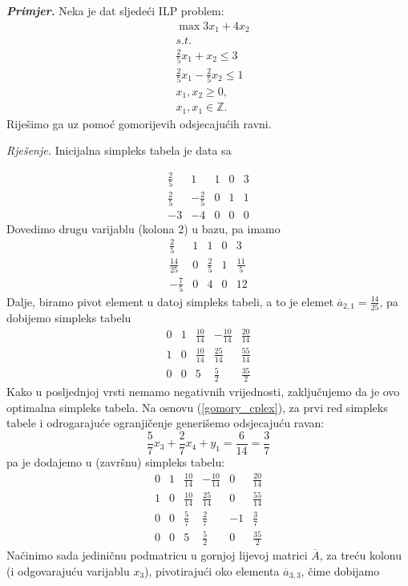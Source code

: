 \documentclass[a4paper, utf8, 11pt, colorlinks]{book}
\begin{document}
\emph{\textbf{Primjer.}} Neka je dat sljedeći ILP problem:\\
$$\begin{array}{ll}
    &\max 3 x_1 + 4 x_2 \\
    & {s.t. }  \\
    & \frac{2}{5}x_1 + x_2 \leq 3 \\
    &\frac{2}{5}x_1 - \frac{2}{5}x_2 \leq 1 \\
    &x_1, x_2 \geq 0, \\
    &  x_1, x_1 \in \mathbb{Z}.
\end{array}$$
Riješimo ga uz pomoć gomorijevih odsjecajućih ravni. 

\emph{Rješenje.}
Inicijalna simpleks tabela je data sa 

$$\begin{array}{cccc|c}
   \frac{2}{5}           & 1               & 1 & 0 & 3 \\
   \frac{2}{5}           & -\frac{2}{5}    & 0 & 1 & 1 \\ \hline
   -3                    &  -4             & 0 & 0 & 0
\end{array}$$
Dovedimo drugu varijablu (kolona 2) u bazu, pa imamo 
$$\begin{array}{cccc|c}
   \frac{2}{5}           & 1               & 1           & 0 & 3 \\
   \frac{14}{25}         & 0               & \frac{2}{5} & 1 & \frac{11}{5}\\ \hline
   -\frac{7}{5}                  & 0               &4 & 0 & 12
\end{array}$$
Dalje, biramo pivot element u datoj simpleks tabeli, a to je elemet $\overline{a}_{2,1} = \frac{14}{25}$, pa dobijemo simpleks tabelu
$$
\begin{array}{cccc|c}
    0    &  1  &  \frac{10}{14} &  -\frac{10}{14}  &  \frac{20}{14}                  \\
    1    &  0  &  \frac{10}{14} &   \frac{25}{14}  &   \frac{55}{14}\\ \hline
    0    &  0  &  5             &    \frac{5}{2}   &    \frac{35}{2}
\end{array}
$$
Kako u posljednjoj vrsti nemamo negativnih vrijednosti, zaključujemo da je ovo optimalna simpleks tabela. Na osnovu (\ref{gomory_cplex}),   za prvi red simpleks tabele i odrogarajuće ogranjičenje generišemo odsjecajuću ravan:
$$   \frac{5}{7}x_3 + \frac{2}{7} x_4 +      y_1   = \frac{6}{14}=\frac{3}{7}$$
pa je dodajemo u (završnu) simpleks tabelu:
$$
\begin{array}{ccccc|c}
    0    &  1  &  \frac{10}{14} &  -\frac{10}{14}  &  0 & \frac{20}{14}                  \\
    1    &  0  &  \frac{10}{14} &   \frac{25}{14}  &  0 & \frac{55}{14}\\ 
    0    &  0  & \frac{5}{7}    &   \frac{2}{7}    &  -1 & \frac{3}{7}  \\
     \hline 
    0    &  0  &  5             &    \frac{5}{2}   &  0 &    \frac{35}{2}
\end{array}
$$
Načinimo sada jediničnu podmatricu u gornjoj lijevoj matrici $\overline{A}$, za treću kolonu (i odgovarajuću varijablu $x_3$), pivotirajući oko elementa $\overline{a}_{3,3}$, čime dobijamo 
\end{document}
